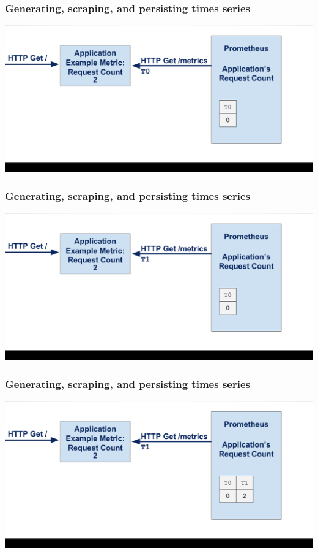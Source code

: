 \documentclass[aspectratio=169]{beamer}
\begin{document}
\begin{frame}
        \frametitle{Generating, scraping, and persisting times series}
        \includegraphics[width=\textwidth]{06-cropped.png}
\end{frame}

\begin{frame}
        \frametitle{Generating, scraping, and persisting times series}
        \includegraphics[width=\textwidth]{07-cropped.png}
\end{frame}

\begin{frame}
        \frametitle{Generating, scraping, and persisting times series}
        \includegraphics[width=\textwidth]{08-cropped.png}
\end{frame}
\end{document}
